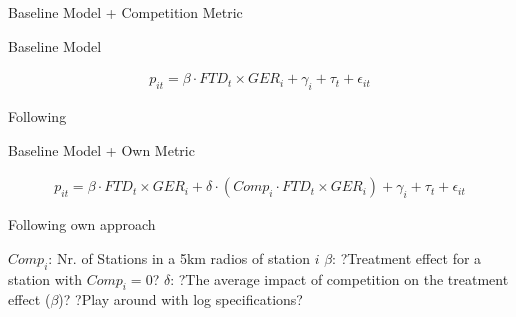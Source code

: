 \begin{frame}{Baseline Model + Competition Metric}

\vspace{-0.9cm}

\begin{block}{Baseline Model}

\small
\vspace{-0.4cm}
\begin{equation}
\begin{aligned}
\label{eq:Base_DiD3}
p_{it} = \beta \cdot FTD_{t} \times GER_{i} + \gamma_{i} + \tau_{t} + \epsilon_{it} 
\end{aligned}
\end{equation}

\begin{tiny}
Following \textcite{Frondel2024}    
\end{tiny}

\end{block}



\begin{block}{Baseline Model + Own Metric}

\small
\vspace{-0.6cm}
\begin{equation}
\begin{aligned}
\label{eq:Base_DiD4}
p_{it} = \beta \cdot FTD_{t} \times GER_{i} + \delta \cdot (Comp_{i} \cdot FTD_{t} \times GER_{i}) + \gamma_{i} + \tau_{t} + \epsilon_{it} 
\end{aligned}
\end{equation}

\vspace{-0.3cm}
\begin{tiny}
    Following own approach
\end{tiny}


\end{block}

\vspace{-0.3cm}

\begin{outline}
\small
    \1 $Comp_{i}$: Nr. of Stations in a 5km radios of station $i$
    \1 $\beta$: \textcolor{BrickRed}{?}Treatment effect for a station with $Comp_{i} = 0$\textcolor{BrickRed}{?}
    \1 $\delta$: \textcolor{BrickRed}{?}The average impact of competition on the treatment effect ($\beta$)\textcolor{BrickRed}{?}
    \1 \textcolor{BrickRed}{?}Play around with log specifications\textcolor{BrickRed}{?}
\end{outline}


\end{frame}







